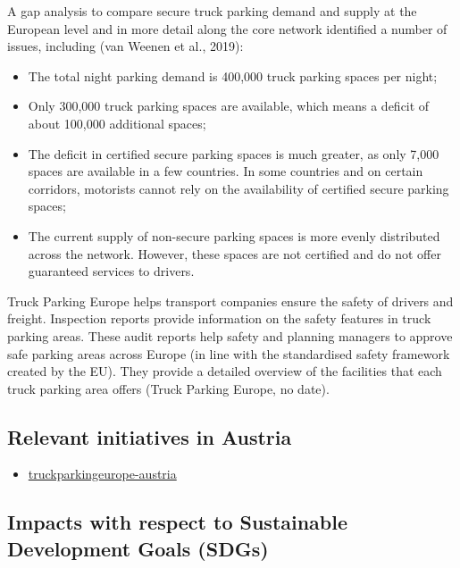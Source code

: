 \documentclass[
]{book}
\providecommand{\tightlist}{%
  \setlength{\itemsep}{0pt}\setlength{\parskip}{0pt}}
\begin{document}
A gap analysis to compare secure truck parking demand and supply at the European level and in more detail along the core network identified a number of issues, including (van Weenen et al., 2019):

\begin{itemize}
\tightlist
\item
  The total night parking demand is 400,000 truck parking spaces per night;
\item
  Only 300,000 truck parking spaces are available, which means a deficit of about 100,000 additional spaces;
\item
  The deficit in certified secure parking spaces is much greater, as only 7,000 spaces are available in a few countries. In some countries and on certain corridors, motorists cannot rely on the availability of certified secure parking spaces;
\item
  The current supply of non-secure parking spaces is more evenly distributed across the network. However, these spaces are not certified and do not offer guaranteed services to drivers.
\end{itemize}

Truck Parking Europe helps transport companies ensure the safety of drivers and freight. Inspection reports provide information on the safety features in truck parking areas. These audit reports help safety and planning managers to approve safe parking areas across Europe (in line with the standardised safety framework created by the EU). They provide a detailed overview of the facilities that each truck parking area offers (Truck Parking Europe, no date).

\hypertarget{relevant-initiatives-in-austria-23}{%
\subsection*{Relevant initiatives in Austria}\label{relevant-initiatives-in-austria-23}}

\begin{itemize}
\tightlist
\item
  \href{https://www.truckparkingeurope.com/secure-truck-parking-overview/austria/}{truckparkingeurope-austria}
\end{itemize}

\hypertarget{impacts-with-respect-to-sustainable-development-goals-sdgs-23}{%
\subsection*{Impacts with respect to Sustainable Development Goals (SDGs)}\label{impacts-with-respect-to-sustainable-development-goals-sdgs-23}}
\end{document}
